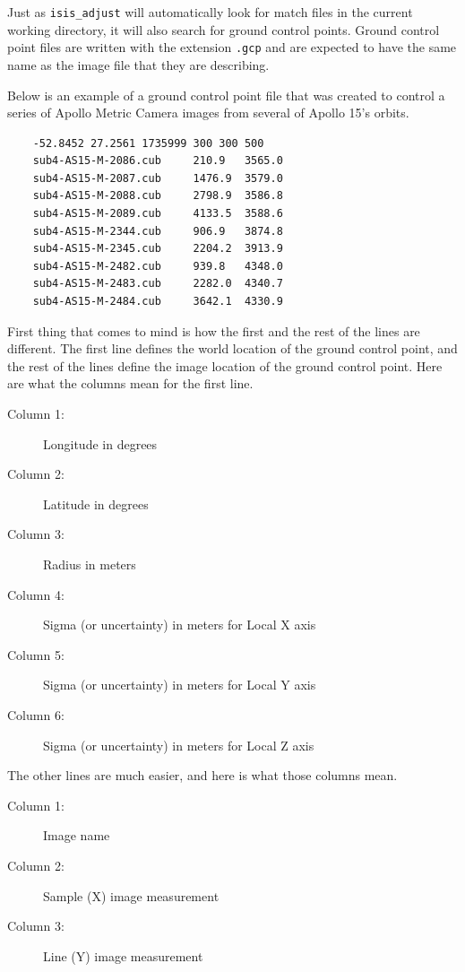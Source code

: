Just as \texttt{isis\_adjust} will automatically look for match files
in the current working directory, it will also search for ground
control points. Ground control point files are written with the
extension \texttt{.gcp} and are expected to have the same name as the
image file that they are describing.

Below is an example of a ground control point file that was created to
control a series of Apollo Metric Camera images from several of Apollo
15's orbits.

\begin{verbatim}
    -52.8452 27.2561 1735999 300 300 500
    sub4-AS15-M-2086.cub     210.9   3565.0
    sub4-AS15-M-2087.cub     1476.9  3579.0
    sub4-AS15-M-2088.cub     2798.9  3586.8
    sub4-AS15-M-2089.cub     4133.5  3588.6
    sub4-AS15-M-2344.cub     906.9   3874.8
    sub4-AS15-M-2345.cub     2204.2  3913.9
    sub4-AS15-M-2482.cub     939.8   4348.0
    sub4-AS15-M-2483.cub     2282.0  4340.7
    sub4-AS15-M-2484.cub     3642.1  4330.9
\end{verbatim}

First thing that comes to mind is how the first and the rest of the
lines are different. The first line defines the world location of the
ground control point, and the rest of the lines define the image
location of the ground control point. Here are what the columns mean
for the first line.

\begin{myindentpar}{2cm}
\begin{description}
  \item[Column 1:] Longitude in degrees
  \item[Column 2:] Latitude in degrees
  \item[Column 3:] Radius in meters
  \item[Column 4:] Sigma (or uncertainty) in meters for Local X axis
  \item[Column 5:] Sigma (or uncertainty) in meters for Local Y axis
  \item[Column 6:] Sigma (or uncertainty) in meters for Local Z axis
\end{description}
\end{myindentpar}

The other lines are much easier, and here is what those columns mean.

\begin{myindentpar}{2cm}
\begin{description}
  \item[Column 1:] Image name
  \item[Column 2:] Sample (X) image measurement
  \item[Column 3:] Line (Y) image measurement
\end{description}
\end{myindentpar}

